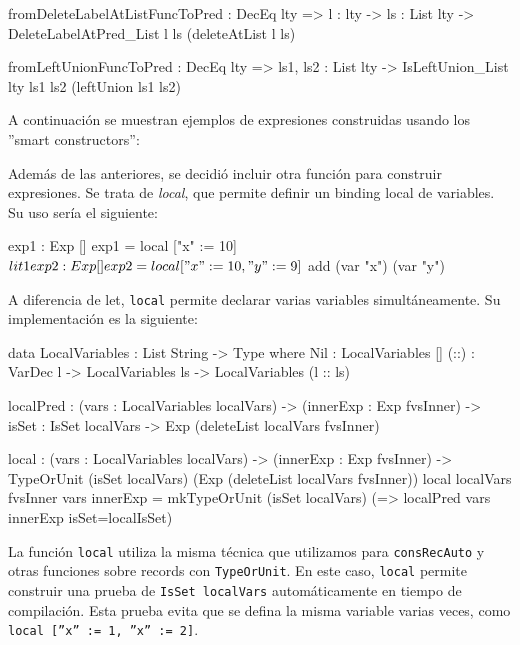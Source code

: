 \begin{code}
fromDeleteLabelAtListFuncToPred : DecEq lty => {l : lty} ->
  {ls : List lty} -> DeleteLabelAtPred_List l ls (deleteAtList l ls)

fromLeftUnionFuncToPred : DecEq lty => {ls1, ls2 : List lty} ->
  IsLeftUnion_List {lty} ls1 ls2 (leftUnion ls1 ls2)
\end{code}

A continuación se muestran ejemplos de expresiones construidas usando los ''smart constructors'':


Además de las anteriores, se decidió incluir otra función para construir expresiones. Se trata de \textit{local}, que permite definir un binding local de variables. Su uso sería el siguiente:

\begin{code}
exp1 : Exp []
exp1 = local ["x" := 10] $ lit 1

exp2 : Exp []
exp2 = local ["x" := 10, "y" := 9] $ add (var "x") (var "y")
\end{code}

A diferencia de let, \texttt{local} permite declarar varias variables simultáneamente. Su implementación es la siguiente:

\begin{code}
data LocalVariables : List String -> Type where
  Nil : LocalVariables []
  (::) : VarDec l -> LocalVariables ls ->
    LocalVariables (l :: ls)

localPred : (vars : LocalVariables localVars) ->
  (innerExp : Exp fvsInner) -> {isSet : IsSet localVars} ->
  Exp (deleteList localVars fvsInner)

local : (vars : LocalVariables localVars) -> (innerExp : Exp fvsInner) ->
  TypeOrUnit (isSet localVars) (Exp (deleteList localVars fvsInner))
local {localVars} {fvsInner} vars innerExp =
  mkTypeOrUnit (isSet localVars)
    (\localIsSet => localPred vars innerExp {isSet=localIsSet})
\end{code}

La función \texttt{local} utiliza la misma técnica que utilizamos para \texttt{consRecAuto} y otras funciones sobre records con \texttt{TypeOrUnit}. En este caso, \texttt{local} permite construir una prueba de \texttt{IsSet localVars} automáticamente en tiempo de compilación. Esta prueba evita que se defina la misma variable varias veces, como \texttt{local [''x'' := 1, ''x'' := 2]}.

